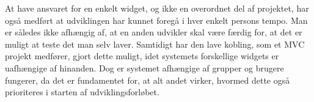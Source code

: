 \noindent At have ansvaret for en enkelt widget, og ikke en overordnet del af projektet, har også medført at udviklingen har kunnet foregå i hver enkelt persons tempo. Man er således ikke afhængig af, at en anden udvikler skal være færdig for, at det er muligt at teste det man selv laver. Samtidigt har den lave kobling, som et MVC projekt medfører, gjort dette muligt, idet systemets forskellige widgets er uafhængige af hinanden. Dog er systemet afhængige af grupper og brugere fungerer, da det er fundamentet for, at alt andet virker, hvormed dette også prioriteres i starten af udviklingsforløbet.

